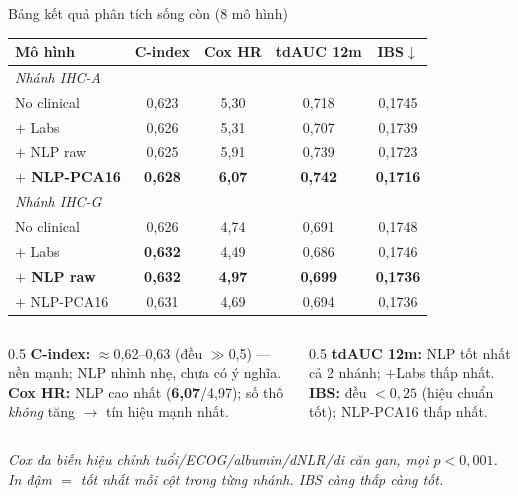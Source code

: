 \documentclass[aspectratio=169,11pt]{beamer}
\begin{document}
\begin{frame}{Bảng kết quả phân tích sống còn (8 mô hình)}
  \footnotesize
  \centering
  \begin{tabular}{@{}lcccc@{}}
    \toprule
    \textbf{Mô hình} & \textbf{C-index} & \textbf{Cox HR} & \textbf{tdAUC 12m} & \textbf{IBS}$\downarrow$ \\
    \midrule
    \multicolumn{5}{l}{\textit{Nhánh IHC-A}} \\
    No clinical          & 0,623 & 5,30 & 0,718 & 0,1745 \\
    $+$ Labs             & 0,626 & 5,31 & 0,707 & 0,1739 \\
    $+$ NLP raw          & 0,625 & 5,91 & 0,739 & 0,1723 \\
    \textbf{$+$ NLP-PCA16} & \textbf{0,628} & \textbf{6,07} & \textbf{0,742} & \textbf{0,1716} \\
    \midrule
    \multicolumn{5}{l}{\textit{Nhánh IHC-G}} \\
    No clinical          & 0,626 & 4,74 & 0,691 & 0,1748 \\
    $+$ Labs             & \textbf{0,632} & 4,49 & 0,686 & 0,1746 \\
    \textbf{$+$ NLP raw} & \textbf{0,632} & \textbf{4,97} & \textbf{0,699} & \textbf{0,1736} \\
    $+$ NLP-PCA16        & 0,631 & 4,69 & 0,694 & 0,1736 \\
    \bottomrule
  \end{tabular}

  \vspace{0.5em}
  \begin{columns}[T]
    \begin{column}{0.5\textwidth}
      \scriptsize
      \textbf{\color{vgreen}C-index:} $\approx$0,62–0,63 (đều $\gg$0,5) — nền mạnh; NLP nhỉnh nhẹ, chưa có ý nghĩa.\\[2pt]
      \textbf{\color{vorange}Cox HR:} NLP cao nhất (\textbf{6,07}/4,97); số thô \emph{không} tăng $\rightarrow$ tín hiệu mạnh nhất.
    \end{column}
    \begin{column}{0.5\textwidth}
      \scriptsize
      \textbf{\color{vgreen}tdAUC 12m:} NLP tốt nhất cả 2 nhánh; $+$Labs thấp nhất.\\[2pt]
      \textbf{\color{vorange}IBS:} đều $<0,25$ (hiệu chuẩn tốt); NLP-PCA16 thấp nhất.
    \end{column}
  \end{columns}
  \vspace{0.3em}
  {\scriptsize\textit{Cox đa biến hiệu chỉnh tuổi/ECOG/albumin/dNLR/di căn gan, mọi $p<0{,}001$. In đậm $=$ tốt nhất mỗi cột trong từng nhánh. IBS càng thấp càng tốt.}}
\end{frame}
\end{document}
